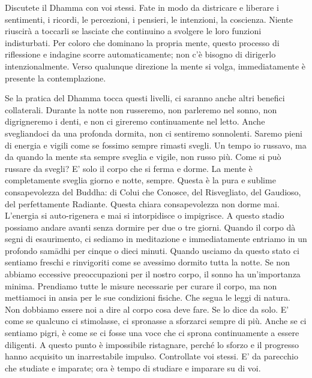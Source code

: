 Discutete il Dhamma con voi stessi. Fate in modo da districare e
liberare i sentimenti, i ricordi, le percezioni, i pensieri, le
intenzioni, la coscienza. Niente riuscirà a toccarli se lasciate che
continuino a svolgere le loro funzioni indisturbati. Per coloro che
dominano la propria mente, questo processo di riflessione e indagine
scorre automaticamente; non c'è bisogno di dirigerlo intenzionalmente.
Verso qualunque direzione la mente si volga, immediatamente è presente
la contemplazione.

Se la pratica del Dhamma tocca questi livelli, ci saranno anche altri
benefici collaterali. Durante la notte non russeremo, non parleremo nel
sonno, non digrigneremo i denti, e non ci gireremo continuamente nel
letto. Anche svegliandoci da una profonda dormita, non ci sentiremo
sonnolenti. Saremo pieni di energia e vigili come se fossimo sempre
rimasti svegli. Un tempo io russavo, ma da quando la mente sta sempre
sveglia e vigile, non russo più. Come si può russare da svegli? E' solo
il corpo che si ferma e dorme. La mente è completamente sveglia giorno e
notte, sempre. Questa è la pura e sublime consapevolezza del Buddha: di
Colui che Conosce, del Risvegliato, del Gaudioso, del perfettamente
Radiante. Questa chiara consapevolezza non dorme mai. L'energia si
auto-rigenera e mai si intorpidisce o impigrisce. A questo stadio
possiamo andare avanti senza dormire per due o tre giorni. Quando il
corpo dà segni di esaurimento, ci sediamo in meditazione e
immediatamente entriamo in un profondo samādhi per cinque o dieci
minuti. Quando usciamo da questo stato ci sentiamo freschi e rinvigoriti
come se avessimo dormito tutta la notte. Se non abbiamo eccessive
preoccupazioni per il nostro corpo, il sonno ha un'importanza minima.
Prendiamo tutte le misure necessarie per curare il corpo, ma non
mettiamoci in ansia per le sue condizioni fisiche. Che segua le leggi di
natura. Non dobbiamo essere noi a dire al corpo cosa deve fare. Se lo
dice da solo. E' come se qualcuno ci stimolasse, ci spronasse a
sforzarci sempre di più. Anche se ci sentiamo pigri, è come se ci fosse
una voce che ci sprona continuamente a essere diligenti. A questo punto
è impossibile ristagnare, perché lo sforzo e il progresso hanno
acquisito un inarrestabile impulso. Controllate voi stessi. E' da
parecchio che studiate e imparate; ora è tempo di studiare e imparare su
di voi.


